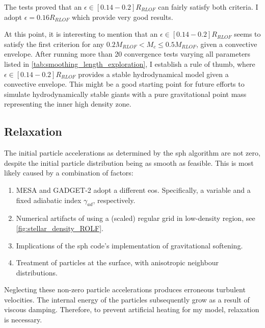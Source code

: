 The tests proved that an $\epsilon \in [0.14-0.2] R_{RLOF}$ can fairly satisfy both criteria. I adopt $\epsilon = 0.16 R_{RLOF}$ which provide very good results.

At this point, it is interesting to mention that an $\epsilon \in [0.14-0.2] R_{RLOF}$ seems to satisfy the first criterion for any $0.2M_{RLOF} < M_c \leq 0.5M_{RLOF}$, given a convective envelope. After running more than 20 convergence tests varying all parameters listed in \cref{tab:smoothing_length_exploration}, I establish a rule of thumb, where $\epsilon \in [0.14-0.2] R_{RLOF}$ provides a stable hydrodynamical model given a convective envelope. This might be a good starting point for future efforts to simulate hydrodynamically stable giants with a pure gravitational point mass representing the inner high density zone.

\subsection{Relaxation}

The initial particle accelerations as determined by the \ac{sph} algorithm are not zero, despite the initial particle distribution being as smooth as feasible. This is most likely caused by a combination of factors:
\begin{enumerate}
    \item MESA and GADGET-2 adopt a different \ac{eos}. Specifically, a variable and a fixed adiabatic index $\gamma_{ad}$, respectively.
    \item Numerical artifacts of using a (scaled) regular grid in low-density region, see \cref{fig:stellar_density_ROLF}.
    \item Implications of the \ac{sph} code's implementation of gravitational softening.
    \item Treatment of particles at the surface, with anisotropic neighbour distributions.
\end{enumerate}
Neglecting these non-zero particle accelerations produces erroneous turbulent velocities. The internal energy of the particles subsequently grow as a result of viscous damping. Therefore, to prevent artificial heating for my model, relaxation is necessary.

